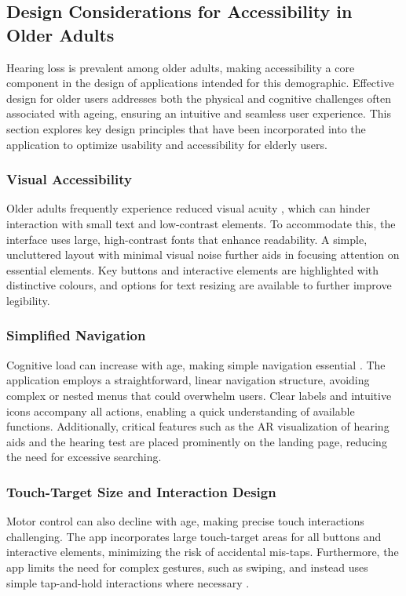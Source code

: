 \documentclass{article}
\begin{document}
\subsection{Design Considerations for Accessibility in Older Adults}

Hearing loss is prevalent among older adults, making accessibility a core component in the design of applications intended for this demographic. Effective design for older users addresses both the physical and cognitive challenges often associated with ageing, ensuring an intuitive and seamless user experience. This section explores key design principles that have been incorporated into the application to optimize usability and accessibility for elderly users.

\subsubsection{Visual Accessibility}
Older adults frequently experience reduced visual acuity \cite{vanderPols2000}, which can hinder interaction with small text and low-contrast elements. To accommodate this, the interface uses large, high-contrast fonts that enhance readability. A simple, uncluttered layout with minimal visual noise further aids in focusing attention on essential elements. Key buttons and interactive elements are highlighted with distinctive colours, and options for text resizing are available to further improve legibility.

\subsubsection{Simplified Navigation}
Cognitive load can increase with age, making simple navigation essential \cite{doube2012}. The application employs a straightforward, linear navigation structure, avoiding complex or nested menus that could overwhelm users. Clear labels and intuitive icons accompany all actions, enabling a quick understanding of available functions. Additionally, critical features such as the AR visualization of hearing aids and the hearing test are placed prominently on the landing page, reducing the need for excessive searching.

\subsubsection{Touch-Target Size and Interaction Design}
Motor control can also decline with age, making precise touch interactions challenging. The app incorporates large touch-target areas for all buttons and interactive elements, minimizing the risk of accidental mis-taps. Furthermore, the app limits the need for complex gestures, such as swiping, and instead uses simple tap-and-hold interactions where necessary \cite{CASTILLA2016909}.
\end{document}
